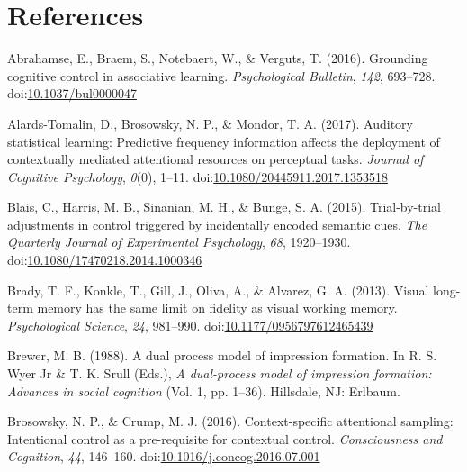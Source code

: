 \documentclass[english,,man,floatsintext]{apa6}
\begin{document}
\newpage

\hypertarget{references}{%
\section{References}\label{references}}

\begingroup
\setlength{\parindent}{-0.5in}
\setlength{\leftskip}{0.5in}

\hypertarget{refs}{}
\leavevmode\hypertarget{ref-abrahamse_grounding_2016}{}%
Abrahamse, E., Braem, S., Notebaert, W., \& Verguts, T. (2016). Grounding cognitive control in associative learning. \emph{Psychological Bulletin}, \emph{142}, 693--728. doi:\href{https://doi.org/10.1037/bul0000047}{10.1037/bul0000047}

\leavevmode\hypertarget{ref-alards-tomalin_auditory_2017}{}%
Alards-Tomalin, D., Brosowsky, N. P., \& Mondor, T. A. (2017). Auditory statistical learning: Predictive frequency information affects the deployment of contextually mediated attentional resources on perceptual tasks. \emph{Journal of Cognitive Psychology}, \emph{0}(0), 1--11. doi:\href{https://doi.org/10.1080/20445911.2017.1353518}{10.1080/20445911.2017.1353518}

\leavevmode\hypertarget{ref-blais_trial-by-trial_2015}{}%
Blais, C., Harris, M. B., Sinanian, M. H., \& Bunge, S. A. (2015). Trial-by-trial adjustments in control triggered by incidentally encoded semantic cues. \emph{The Quarterly Journal of Experimental Psychology}, \emph{68}, 1920--1930. doi:\href{https://doi.org/10.1080/17470218.2014.1000346}{10.1080/17470218.2014.1000346}

\leavevmode\hypertarget{ref-brady_visual_2013}{}%
Brady, T. F., Konkle, T., Gill, J., Oliva, A., \& Alvarez, G. A. (2013). Visual long-term memory has the same limit on fidelity as visual working memory. \emph{Psychological Science}, \emph{24}, 981--990. doi:\href{https://doi.org/10.1177/0956797612465439}{10.1177/0956797612465439}

\leavevmode\hypertarget{ref-brewer_dual_1988}{}%
Brewer, M. B. (1988). A dual process model of impression formation. In R. S. Wyer Jr \& T. K. Srull (Eds.), \emph{A dual-process model of impression formation: Advances in social cognition} (Vol. 1, pp. 1--36). Hillsdale, NJ: Erlbaum.

\leavevmode\hypertarget{ref-brosowsky_context-specific_2016}{}%
Brosowsky, N. P., \& Crump, M. J. (2016). Context-specific attentional sampling: Intentional control as a pre-requisite for contextual control. \emph{Consciousness and Cognition}, \emph{44}, 146--160. doi:\href{https://doi.org/10.1016/j.concog.2016.07.001}{10.1016/j.concog.2016.07.001}
\end{document}
